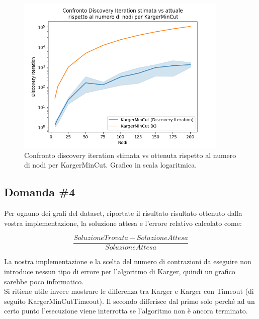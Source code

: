 \begin{figure}[H]
    \centering

    \includegraphics[width=0.9\textwidth]{./images/Confronto_Discovery_Iteration_stimata_vs_attuale__rispetto_al_numero_di_nodi_per_KargerMinCut.png}

    \caption{Confronto discovery iteration stimata vs ottenuta rispetto al numero di nodi per KargerMinCut. Grafico in scala logaritmica.}
    \label{fig:karger-discovery-vs-estimated-k-chart}
\end{figure}

\subsection{Domanda \#4}
\label{sec:question-4}

\begin{displayquote}
Per ognuno dei grafi del dataset, riportate il risultato risultato
ottenuto dalla vostra implementazione, la soluzione attesa e l'errore
relativo calcolato come:

\begin{equation*}
    \frac{SoluzioneTrovata - SoluzioneAttesa}{SoluzioneAttesa}
\end{equation*}

\end{displayquote}

\noindent La nostra implementazione e la scelta del numero di
contrazioni da eseguire non introduce nessun tipo di errore per
l'algoritmo di Karger, quindi un grafico sarebbe poco informatico.\\

\noindent Si ritiene utile invece mostrare le differenza tra
Karger e Karger con Timeout (di seguito KargerMinCutTimeout). Il secondo
differisce dal primo solo perché ad un certo punto l'esecuzione viene
interrotta se l'algoritmo non è ancora terminato.\\

